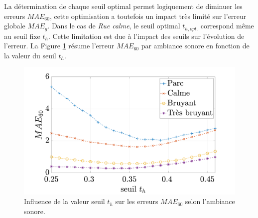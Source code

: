 \begin{table}[h]
\centering
\caption{Erreurs $MAE_{60}$ minimales selon le seuil optimal $t_{h,opt}$ par ambiance sonore, en gras les erreurs minimales.}
\label{tab:erreur_optimise}
\end{table}

La détermination de chaque seuil optimal permet logiquement de diminuer les erreurs $MAE_{60}$, cette optimisation a toutefois un impact très limité sur l'erreur globale $MAE_g$. Dans le cas de \textit{Rue calme}, le seuil optimal $t_{h,opt.}$ correspond même au seuil fixe $t_h$.
Cette limitation est due à l'impact des seuils sur l'évolution de l'erreur. La Figure \ref{fig:maeExpandSeuil} résume l'erreur $MAE_{60}$ par ambiance sonore en fonction de la valeur du seuil $t_h$. 

\begin{figure}[h]
 \centering
 \includegraphics[width=.7\linewidth]{./figures/resultats/maeExpandseuil.pdf}
 \caption{Influence de la valeur seuil $t_h$ sur les erreurs $MAE_{60}$ selon l'ambiance sonore.}
 \label{fig:maeExpandSeuil}
 \end{figure}
  

